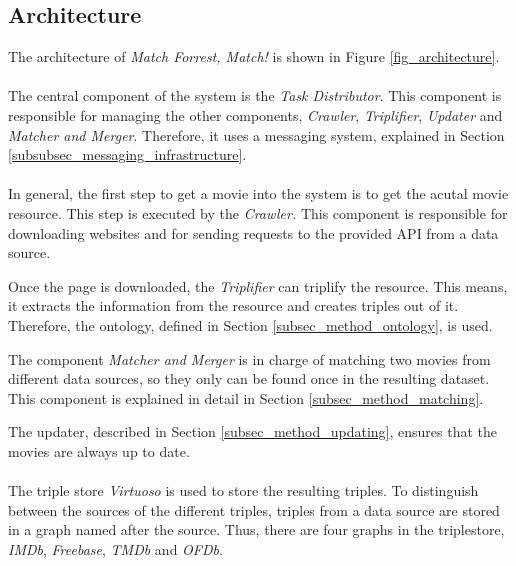 \subsection{Architecture}
\label{subsec_method_architecture}

The architecture of \emph{Match Forrest, Match!} is shown in Figure \ref{fig_architecture}.
\\ \\
The central component of the system is the \textit{Task Distributor}.
This component is responsible for managing the other components, \textit{Crawler}, \textit{Triplifier}, \textit{Updater} and \textit{Matcher and Merger}.
Therefore, it uses a messaging system, explained in Section \ref{subsubsec_messaging_infrastructure}.
\\ \\
In general, the first step to get a movie into the system is to get the acutal movie resource.
This step is executed by the \textit{Crawler.}
This component is responsible for downloading websites and for sending requests to the provided API from a data source.

Once the page is downloaded, the \textit{Triplifier} can triplify the resource.
This means, it extracts the information from the resource and creates triples out of it.
Therefore, the ontology, defined in Section \ref{subsec_method_ontology}, is used.

The component \textit{Matcher and Merger} is in charge of matching two movies from different data sources, so they only can be found once in the resulting dataset.
This component is explained in detail in Section \ref{subsec_method_matching}.

The updater, described in Section \ref{subsec_method_updating}, ensures that the movies are always up to date.
\\ \\
The triple store \textit{Virtuoso} is used to store the resulting triples.
To distinguish between the sources of the different triples, triples from a data source are stored in a graph named after the source.
Thus, there are four graphs in the triplestore, \textit{IMDb}, \textit{Freebase}, \textit{TMDb} and \textit{OFDb}.

